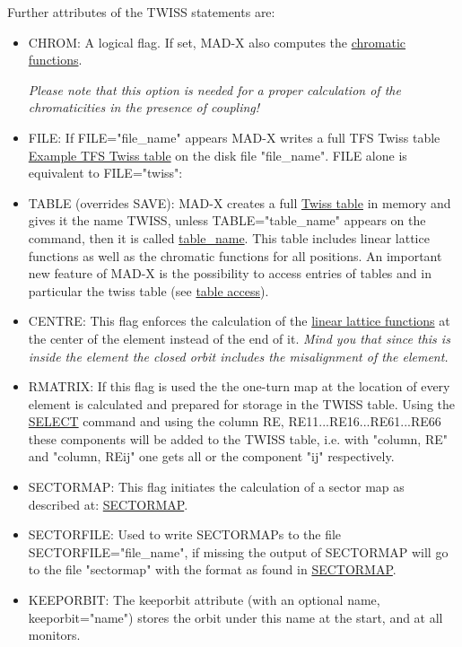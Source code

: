 Further attributes of the TWISS statements are: 
\begin{itemize}
	\item CHROM: A logical flag. If set, MAD-X also computes the     \href{../Introduction/tables.html#chrom}{chromatic     functions}. 

\textit{Please note that this option is needed for a proper calculation of the chromaticities in the presence of coupling!}
	\item FILE: If FILE="file\_name" appears MAD-X writes a full TFS Twiss table \href{../Introduction/select.html#tfs}{Example TFS Twiss table} on the disk file "file\_name". FILE alone is equivalent to FILE="twiss": 
	\item TABLE (overrides SAVE): MAD-X creates a full \href{../Introduction/tables.html#linear}{Twiss table} in memory and gives it the name TWISS, unless TABLE="table\_name" appears on the command, then it is called \href{../Introduction/label.html}{table\_name}. This table includes linear lattice functions as well as the chromatic functions for all positions. An important new feature of MAD-X is the possibility to access entries of tables and in particular the twiss table (see \href{../Introduction/expression.html#table}{table access}).   
	\item CENTRE: This flag enforces the calculation of the \href{../Introduction/tables.html#linear}{linear lattice functions} at the center of the element instead of the end of it. \textit{ Mind you that since this is inside the element the closed orbit includes the misalignment of the element.}
	\item RMATRIX: If this flag is used the the one-turn map at the location of every element is calculated and prepared for storage in the TWISS table. Using the \href{../Introduction/select.html}{SELECT} command and using the column RE, RE11...RE16...RE61...RE66 these components will be added to the TWISS table, i.e. with "column, RE" and "column, REij" one gets all or the component "ij" respectively.   
	\item SECTORMAP: This flag initiates the calculation of a sector map as described at: \href{../Introduction/sectormap.html}{SECTORMAP}.   
	\item SECTORFILE: Used to write SECTORMAPs to the file SECTORFILE="file\_name", if missing the output of SECTORMAP will go to the file "sectormap" with the format as found in \href{../Introduction/sectormap.html}{SECTORMAP}.   
	\item KEEPORBIT: The keeporbit attribute (with an optional name, keeporbit="name") stores the orbit under this name at the start, and at all monitors.   

\end{itemize}
